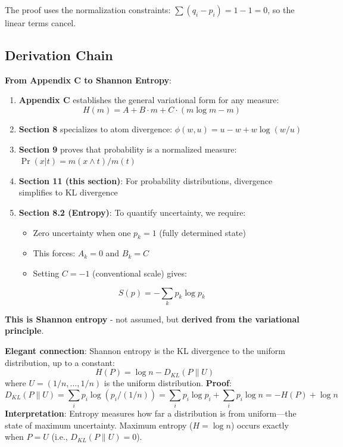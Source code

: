 \documentclass[11pt]{article}
\theoremstyle{definition}
\theoremstyle{remark}
\begin{document}
The proof uses the normalization constraints: $\sum (q_i - p_i) = 1 - 1 = 0$, so the linear terms cancel.

\subsection{Derivation Chain}

\textbf{From Appendix C to Shannon Entropy}:

\begin{enumerate}
\item \textbf{Appendix C} establishes the general variational form for any measure:
\[ H(m) = A + B \cdot m + C \cdot (m \log m - m) \]

\item \textbf{Section 8} specializes to atom divergence: $\phi(w, u) = u - w + w \log(w/u)$

\item \textbf{Section 9} proves that probability is a normalized measure: $\Pr(x|t) = m(x \wedge t) / m(t)$

\item \textbf{Section 11 (this section)}: For probability distributions, divergence simplifies to KL divergence

\item \textbf{Section 8.2 (Entropy)}: To quantify uncertainty, we require:
\begin{itemize}
\item Zero uncertainty when one $p_k = 1$ (fully determined state)
\item This forces: $A_k = 0$ and $B_k = C$
\item Setting $C = -1$ (conventional scale) gives:
\end{itemize}
\[ S(p) = -\sum_k p_k \log p_k \]
\end{enumerate}

\textbf{This is Shannon entropy} - not assumed, but \textbf{derived from the variational principle}.

\textbf{Elegant connection}: Shannon entropy is the KL divergence to the uniform distribution, up to a constant:
\[ H(P) = \log n - D_{KL}(P \| U) \]
where $U = (1/n, \ldots, 1/n)$ is the uniform distribution. \textbf{Proof}:
\[ D_{KL}(P \| U) = \sum_i p_i \log(p_i / (1/n)) = \sum_i p_i \log p_i + \sum_i p_i \log n = -H(P) + \log n \]
\textbf{Interpretation}: Entropy measures how far a distribution is from uniform---the state of maximum uncertainty. Maximum entropy ($H = \log n$) occurs exactly when $P = U$ (i.e., $D_{KL}(P \| U) = 0$).
\end{document}
